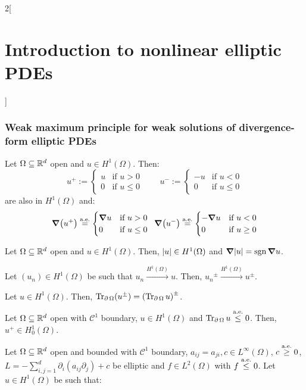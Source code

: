 \documentclass[../../../main_math.tex]{subfiles}
\begin{document}
\begin{multicols}{2}[\section{Introduction to nonlinear elliptic PDEs}]
  \subsubsection{Weak maximum principle for weak solutions of divergence-form elliptic PDEs}
  \begin{lemma}\label{INEPDE:lemma1_weak_max}
    Let $\Omega\subseteq\mathbb{R}^d$ open and $u\in H^1(\Omega)$. Then:
    $$
      u^{+}:=\begin{cases}
        u & \text{if }u> 0    \\
        0 & \text{if }u\leq 0
      \end{cases}\qquad
      u^{-}:=\begin{cases}
        -u & \text{if }u< 0    \\
        0  & \text{if }u\leq 0
      \end{cases}
    $$
    are also in $H^1(\Omega)$ and:
    $$
      \grad(u^+)\overset{\text{a.e.}}{=}\begin{cases}
        \grad u & \text{if }u>0     \\
        0       & \text{if }u\leq 0
      \end{cases}\;\;
      \grad(u^-)\overset{\text{a.e.}}{=}\begin{cases}
        -\grad u & \text{if }u<0     \\
        0        & \text{if }u\geq 0
      \end{cases}
    $$
  \end{lemma}
  \begin{corollary}
    Let $\Omega\subseteq\mathbb{R}^d$ open and $u\in H^1(\Omega)$. Then, $\abs{u}\in H^1(\Omega)$ and $\grad{\abs{u}}=\operatorname{sgn}\grad{u}$.
  \end{corollary}
  \begin{lemma}
    Let $(u_n)\in H^1(\Omega)$ be such that $u_n\overset{H^1(\Omega)}{\longrightarrow} u$. Then, ${u_n}^\pm\overset{H^1(\Omega)}{\longrightarrow} u^\pm$.
  \end{lemma}
  \begin{corollary}
    Let $u\in H^1(\Omega)$. Then, $\Tr_{\operatorname{\partial}{\Omega}}(u^\pm)={(\Tr_{\operatorname{\partial}{\Omega}}u)}^\pm$.
  \end{corollary}
  \begin{lemma}\label{INEPDE:lemma3_weak_max}
    Let $\Omega\subseteq\mathbb{R}^d$ open with $\mathcal{C}^1$ boundary, $u\in H^1(\Omega)$ and $\Tr_{\operatorname{\partial}{\Omega}}u\overset{\text{a.e.}}{\leq}0$. Then, $u^+\in H^1_0(\Omega)$.
  \end{lemma}
  \begin{theorem}
    Let $\Omega\subseteq\mathbb{R}^d$ open and bounded with $\mathcal{C}^1$ boundary, $a_{ij}=a_{ji},c\in L^\infty(\Omega)$, $c\overset{\text{a.e.}}{\geq}0$, $L=-\sum_{i,j=1}^d\partial_i(a_{ij}\partial_j)+c$ be elliptic and $f\in L^2(\Omega)$ with $f\overset{\text{a.e.}}{\leq} 0$. Let $u\in H^1(\Omega)$ be such that:

\end{theorem}
\end{multicols}
\end{document}
